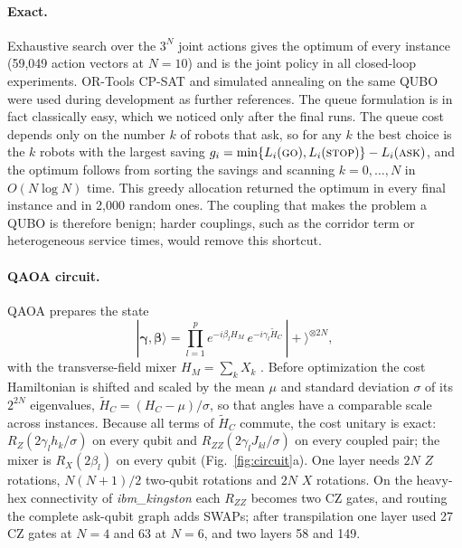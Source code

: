 \documentclass[a4paper,fleqn]{cas-dc}
\newcommand{\pgo}{\textsc{go}}
\newcommand{\pstop}{\textsc{stop}}
\newcommand{\pask}{\textsc{ask}}
\begin{document}
\paragraph{Exact.} Exhaustive search over the $3^N$ joint actions gives the optimum of every instance (59{,}049 action vectors at $N = 10$) and is the joint policy in all closed-loop experiments. OR-Tools CP-SAT \citep{ortools} and simulated annealing \citep{kirkpatrick1983sa} on the same QUBO were used during development as further references. The queue formulation is in fact classically easy, which we noticed only after the final runs. The queue cost depends only on the number $k$ of robots that ask, so for any $k$ the best choice is the $k$ robots with the largest saving $g_i = \min\{L_i(\pgo), L_i(\pstop)\} - L_i(\pask)$, and the optimum follows from sorting the savings and scanning $k = 0,\dots,N$ in $O(N \log N)$ time. This greedy allocation returned the optimum in every final instance and in 2{,}000 random ones. The coupling that makes the problem a QUBO is therefore benign; harder couplings, such as the corridor term or heterogeneous service times, would remove this shortcut.

\paragraph{QAOA circuit.} QAOA prepares the state
\begin{equation}
|\boldsymbol\gamma,\boldsymbol\beta\rangle = \prod_{l=1}^{p} e^{-i\beta_l H_M}\, e^{-i\gamma_l \tilde H_C}\, |+\rangle^{\otimes 2N},
\label{eq:qaoa}
\end{equation}
with the transverse-field mixer $H_M = \sum_k X_k$ \citep{farhi2014qaoa}. Before optimization the cost Hamiltonian is shifted and scaled by the mean $\mu$ and standard deviation $\sigma$ of its $2^{2N}$ eigenvalues, $\tilde H_C = (H_C - \mu)/\sigma$, so that angles have a comparable scale across instances. Because all terms of $\tilde H_C$ commute, the cost unitary is exact: $R_Z(2\gamma_l h_k/\sigma)$ on every qubit and $R_{ZZ}(2\gamma_l J_{kl}/\sigma)$ on every coupled pair; the mixer is $R_X(2\beta_l)$ on every qubit (Fig.~\ref{fig:circuit}a). One layer needs $2N$ $Z$ rotations, $N(N+1)/2$ two-qubit rotations and $2N$ $X$ rotations. On the heavy-hex connectivity of \textit{ibm\_kingston} each $R_{ZZ}$ becomes two CZ gates, and routing the complete ask-qubit graph adds SWAPs; after transpilation one layer used 27 CZ gates at $N = 4$ and 63 at $N = 6$, and two layers 58 and 149.
\end{document}
